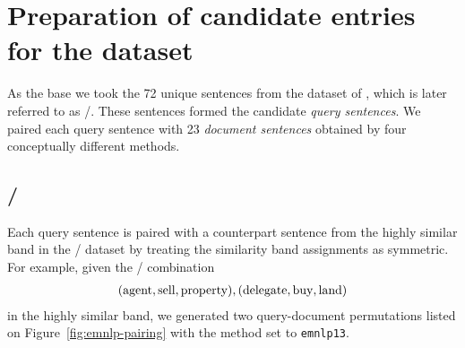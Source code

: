 



\section{Preparation of candidate entries for the dataset}
\label{sec:design}

As the base we took the 72 unique sentences from the dataset of \cite{kartsaklis-sadrzadeh:2013:EMNLP,kartsadrqpl2014}, which is later referred to as \emnlp/.\footnotemark{} These sentences formed the candidate \emph{query sentences}. We paired each query sentence with 23 \emph{document sentences} obtained by four conceptually different methods.




\subsection{\emnlp/}

Each query sentence is paired with a counterpart sentence from the highly similar band\footnotemark{} in the \emnlp/ dataset by treating the similarity band assignments as symmetric. For example, given the \emnlp/ combination
%
\begin{eqnarray*}
(\textmd{agent}, \textmd{sell}, \textmd{property}),
(\textmd{delegate}, \textmd{buy}, \textmd{land})
\end{eqnarray*}
%
in the highly similar band, we generated two query-document permutations listed on Figure~\ref{fig:emnlp-pairing} with the method set to \texttt{emnlp13}.



